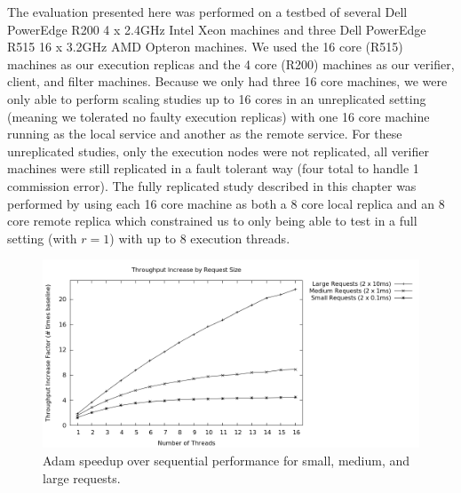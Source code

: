 \documentclass[11pt, oneside]{report}
\begin{document}
The evaluation presented here was performed on a testbed of several Dell PowerEdge R200 4 x 2.4GHz Intel Xeon machines and three Dell PowerEdge R515 16 x 3.2GHz AMD Opteron machines. 
We used the 16 core (R515) machines as our execution replicas and the 4 core (R200) machines as our verifier, client, and filter machines. 
Because we only had three 16 core machines, we were only able to perform scaling studies up to 16 cores in an unreplicated setting (meaning we tolerated no faulty execution replicas) with one 16 core machine running as the local service and another as the remote service. 
For these unreplicated studies, only the execution nodes were not replicated, all verifier machines were still replicated in a fault tolerant way (four total to handle 1 commission error).
The fully replicated study described in this chapter was performed by using each 16 core machine as both a 8 core local replica and an 8 core remote replica which constrained us to only being able to test in a full setting (with $r = 1$) with up to 8 execution threads.

\begin{figure}[h]
\centering
\includegraphics[width=1.0\textwidth]{graphs/requestweights/graph.png}
\caption{\label{scaling}Adam speedup over sequential performance for small, medium, and large requests.}
\end{figure}
\end{document}
